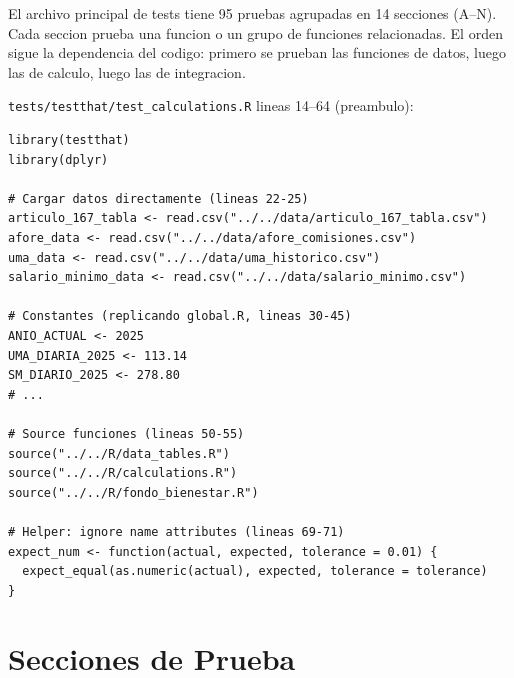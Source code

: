 \documentclass[11pt, letterpaper, twoside]{report}
\begin{document}
\begin{intuicionbox}
El archivo principal de tests tiene 95 pruebas agrupadas en 14 secciones (A--N).
Cada seccion prueba una funcion o un grupo de funciones relacionadas. El orden
sigue la dependencia del codigo: primero se prueban las funciones de datos,
luego las de calculo, luego las de integracion.
\end{intuicionbox}

\begin{codigobox}
\texttt{tests/testthat/test\_calculations.R} lineas 14--64 (preambulo):
\begin{lstlisting}[caption={Preambulo de tests: carga sin Shiny}]
library(testthat)
library(dplyr)

# Cargar datos directamente (lineas 22-25)
articulo_167_tabla <- read.csv("../../data/articulo_167_tabla.csv")
afore_data <- read.csv("../../data/afore_comisiones.csv")
uma_data <- read.csv("../../data/uma_historico.csv")
salario_minimo_data <- read.csv("../../data/salario_minimo.csv")

# Constantes (replicando global.R, lineas 30-45)
ANIO_ACTUAL <- 2025
UMA_DIARIA_2025 <- 113.14
SM_DIARIO_2025 <- 278.80
# ...

# Source funciones (lineas 50-55)
source("../../R/data_tables.R")
source("../../R/calculations.R")
source("../../R/fondo_bienestar.R")

# Helper: ignore name attributes (lineas 69-71)
expect_num <- function(actual, expected, tolerance = 0.01) {
  expect_equal(as.numeric(actual), expected, tolerance = tolerance)
}
\end{lstlisting}
\end{codigobox}


\section{Secciones de Prueba}
\end{document}
